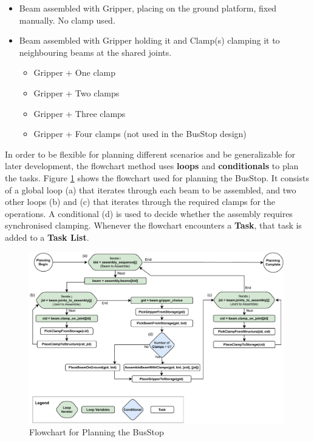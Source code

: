 \begin{itemize}
	\item Beam assembled with Gripper, placing on the ground platform, fixed manually. No clamp used.

	\item Beam assembled with Gripper holding it and Clamp(s) clamping it to neighbouring beams at the shared joints.

	\begin{itemize}
		\item Gripper + One clamp

		\item Gripper + Two clamps

		\item Gripper + Three clamps

		\item Gripper + Four clamps (not used in the BusStop design)

	\end{itemize}
\end{itemize}
In order to be flexible for planning different scenarios and be generalizable for later development, the flowchart method uses \textbf{loops }and \textbf{conditionals }to plan the tasks. Figure \ref{fig:flowchart-for-planning-busstop} shows the flowchart used for planning the BusStop. It consists of a global loop (a) that iterates through each beam to be assembled, and two other loops (b) and (c) that iterates through the required clamps for the operations. A conditional (d) is used to decide whether the assembly requires synchronised clamping. Whenever the flowchart encounters a \textbf{Task}, that task is added to a \textbf{Task List}. 

\begin{figure}[!h]
    \centering
    \includegraphics[width=0.99\textwidth]{images/6a/flowchart-1.pdf}
    \caption{Flowchart for Planning the BusStop}
    \label{fig:flowchart-for-planning-busstop}
\end{figure}


